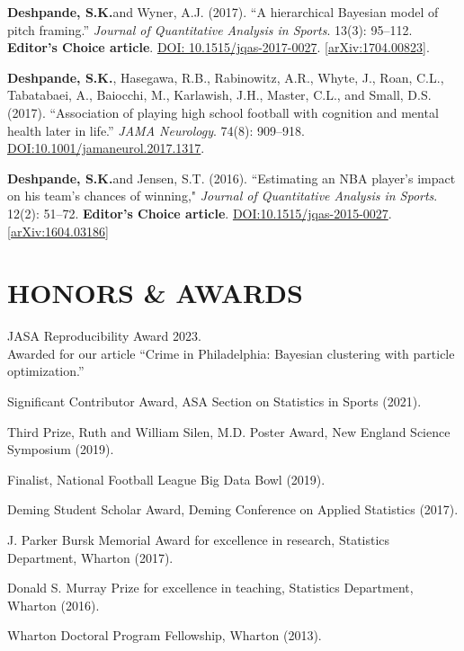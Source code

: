 \documentclass[margin]{res}
\def\skd{\textbf{Deshpande, S.K.}}
\begin{document}
\begin{resume}
\skd and Wyner, A.J. (2017). ``A hierarchical Bayesian model of pitch framing.'' \textit{Journal of Quantitative Analysis in Sports}. 13(3): 95--112. \textbf{Editor's Choice article}.   \href{https://doi.org/10.1515/jqas-2017-0027}{DOI: 10.1515/jqas-2017-0027}. \href{https://arxiv.org/abs/1704.00823}{[arXiv:1704.00823]}.

\skd, Hasegawa, R.B., Rabinowitz, A.R., Whyte, J., Roan, C.L., Tabatabaei, A., Baiocchi, M., Karlawish, J.H., Master, C.L., and Small, D.S. (2017). ``Association of playing high school football with cognition and mental health later in life.'' \textit{JAMA Neurology}. 74(8): 909--918. \href{https://doi.org/10.1001/jamaneurol.2017.1317}{DOI:10.1001/jamaneurol.2017.1317}.

\skd and Jensen, S.T. (2016). ``Estimating an NBA player's impact on his team's chances of winning," \textit{Journal of Quantitative Analysis in Sports}. 12(2): 51--72. \textbf{Editor's Choice article}.  \href{https://doi.org/10.1515/jqas-2015-0027}{DOI:10.1515/jqas-2015-0027}.\href{https://arxiv.org/abs/1604.03186}{[arXiv:1604.03186]}


\section{HONORS \& AWARDS} 

JASA Reproducibility Award 2023. \\
Awarded for our article ``Crime in Philadelphia: Bayesian clustering with particle optimization.''

Significant Contributor Award, ASA Section on Statistics in Sports (2021).

Third Prize, Ruth and William Silen, M.D. Poster Award, New England Science Symposium (2019).

Finalist, National Football League Big Data Bowl (2019).

Deming Student Scholar Award, Deming Conference on Applied Statistics (2017).

J. Parker Bursk Memorial Award for excellence in research, Statistics Department, Wharton (2017).

Donald S. Murray Prize for excellence in teaching, Statistics Department, Wharton (2016).

Wharton Doctoral Program Fellowship, Wharton (2013).


\end{resume}
\end{document}
